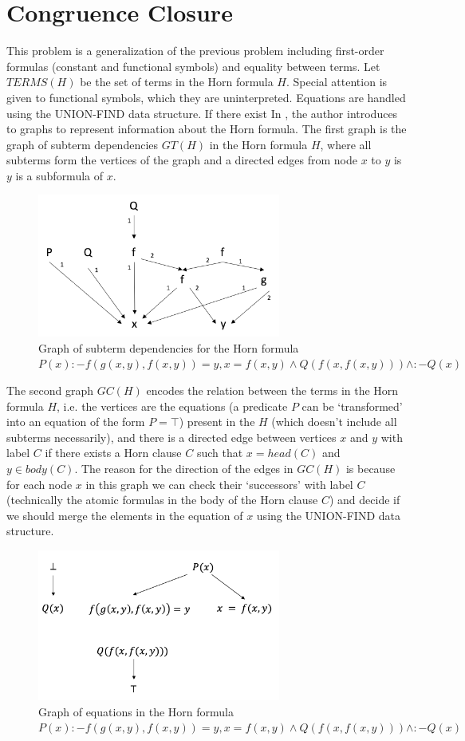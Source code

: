 \section{Congruence Closure}

This problem is a generalization of the previous problem
including first-order formulas (constant and functional symbols)
and equality between terms. Let $TERMS(H)$ be the set of terms in the Horn
formula $H$. Special attention is given to functional symbols, which they
are uninterpreted. Equations are handled using the UNION-FIND
data structure. If there exist In \cite{GALLIER1987233}, the author
introduces to graphs to represent information about the
Horn formula. The first graph is the graph of subterm dependencies
$GT(H)$ in the Horn formula $H$, where all subterms form the vertices of the graph and
a directed edges from node $x$ to $y$ is $y$ is a subformula of
$x$.

\begin{figure}[h]
  \centering
  \includegraphics[width=8cm]{GT1}
  \caption{Graph of subterm dependencies for the Horn formula $P(x) :- f(g(x, y), f(x, y)) = y, x = f(x, y) \land Q(f(x, f(x, y))) \land :- Q(x)$}
\end{figure}

The second graph $GC(H)$ encodes the relation between the terms
in the Horn formula $H$, i.e. the vertices are the equations (a predicate $P$
can be `transformed' into an equation of the form $P = \top$)
present in the $H$ (which doesn't include all subterms necessarily), and
there is a directed edge between vertices $x$ and $y$ with label $C$
if there exists a Horn clause $C$ such that $x = head(C)$ and $y \in body(C)$.
The reason for the direction of the edges in $GC(H)$ is because for each node $x$ in
this graph we can check their `successors' with label $C$ (technically the
atomic formulas in the body of the Horn clause $C$) and decide if we should merge
the elements in the equation of $x$ using the UNION-FIND data structure.

\begin{figure}[h]
  \centering
  \includegraphics[width=8cm]{GC1}
  \caption{Graph of equations in the Horn formula $P(x) :- f(g(x, y), f(x, y)) = y, x = f(x, y) \land Q(f(x, f(x, y))) \land :- Q(x)$}
\end{figure}

